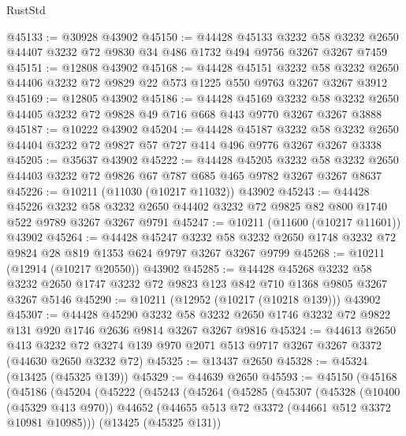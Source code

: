 \begin{lexlean}{RustStd}
\begin{coremodule}
@45133 := @30928 @43902
@45150 := @44428
    @45133
    @3232
    @58
    @3232
    @2650
    @44407
    @3232
    @72
    @9830
    @34
    @486
    @1732
    @494
    @9756
    @3267
    @3267
    @7459
@45151 := @12808 @43902
@45168 := @44428
    @45151
    @3232
    @58
    @3232
    @2650
    @44406
    @3232
    @72
    @9829
    @22
    @573
    @1225
    @550
    @9763
    @3267
    @3267
    @3912
@45169 := @12805 @43902
@45186 := @44428
    @45169
    @3232
    @58
    @3232
    @2650
    @44405
    @3232
    @72
    @9828
    @49
    @716
    @668
    @443
    @9770
    @3267
    @3267
    @3888
@45187 := @10222 @43902
@45204 := @44428
    @45187
    @3232
    @58
    @3232
    @2650
    @44404
    @3232
    @72
    @9827
    @57
    @727
    @414
    @496
    @9776
    @3267
    @3267
    @3338
@45205 := @35637 @43902
@45222 := @44428
    @45205
    @3232
    @58
    @3232
    @2650
    @44403
    @3232
    @72
    @9826
    @67
    @787
    @685
    @465
    @9782
    @3267
    @3267
    @8637
@45226 := @10211 (@11030 (@10217 @11032)) @43902
@45243 := @44428
    @45226
    @3232
    @58
    @3232
    @2650
    @44402
    @3232
    @72
    @9825
    @82
    @800
    @1740
    @522
    @9789
    @3267
    @3267
    @9791
@45247 := @10211 (@11600 (@10217 @11601)) @43902
@45264 := @44428
    @45247
    @3232
    @58
    @3232
    @2650
    @1748
    @3232
    @72
    @9824
    @28
    @819
    @1353
    @624
    @9797
    @3267
    @3267
    @9799
@45268 := @10211 (@12914 (@10217 @20550)) @43902
@45285 := @44428
    @45268
    @3232
    @58
    @3232
    @2650
    @1747
    @3232
    @72
    @9823
    @123
    @842
    @710
    @1368
    @9805
    @3267
    @3267
    @5146
@45290 := @10211 (@12952 (@10217 (@10218 @139))) @43902
@45307 := @44428
    @45290
    @3232
    @58
    @3232
    @2650
    @1746
    @3232
    @72
    @9822
    @131
    @920
    @1746
    @2636
    @9814
    @3267
    @3267
    @9816
@45324 := @44613
    @2650
    @413
    @3232
    @72
    @3274
    @139
    @970
    @2071
    @513
    @9717
    @3267
    @3267
    @3372
    (@44630 @2650 @3232 @72)
@45325 := @13437 @2650
@45328 := @45324 (@13425 (@45325 @139))
@45329 := @44639 @2650
@45593 := @45150
    (@45168
      (@45186
        (@45204
          (@45222
            (@45243
              (@45264
                (@45285
                  (@45307
                    (@45328
                      (@10400 (@45329 @413 @970))
                      @44652
                      (@44655 @513 @72 @3372 (@44661 @512 @3372 @10981 @10985)))
                    (@13425 (@45325 @131))

\end{coremodule}
\end{lexlean}
